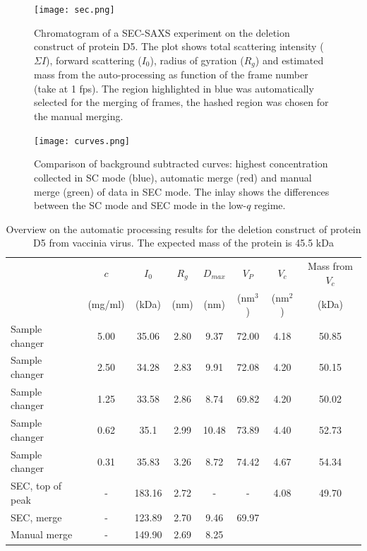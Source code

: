 \documentclass[preprint,pdf]{iucr}              %
\begin{document}
\begin{figure}
\centering
\texttt{[image: sec.png]}
\caption{Chromatogram of a SEC-SAXS experiment on the deletion construct of
protein D5.
The plot shows total scattering intensity ($\Sigma I$), forward scattering
($I_0$), radius of gyration ($R_g$) and estimated mass from the
auto-processing as function of the frame number (take at 1 fps).
The region highlighted in blue was automatically selected for the merging of
frames, the hashed region was chosen for the manual merging.}
\label{fgr:SEC}
\end{figure}

\begin{figure}
\centering
\texttt{[image: curves.png]}
\caption{Comparison of background subtracted curves: highest concentration
collected in SC mode (blue), automatic merge (red) and manual
merge (green) of data in SEC mode. 
The inlay shows the differences between the SC mode and SEC mode in the
low-$q$ regime. }
\label{fgr:curves}
\end{figure}

\begin{table}
\begin{tabular}{ l c | c c c c c c }
   & $c$  & $I_{0}$  & $R_g$ & $D_{max}$ & $V_{P}$ & $V_{c}$ & Mass from $V_{c}$\\
	 &  (mg/ml) & (kDa) & (nm)&  (nm)&  (nm$^{3}$) & (nm$^{2}$) & (kDa)\\
\hline
Sample changer & 5.00  & 35.06 & 2.80 & 9.37  & 72.00 & 4.18 & 50.85 \\
Sample changer & 2.50  & 34.28 & 2.83  & 9.91  & 72.08 & 4.20 & 50.15 \\
Sample changer & 1.25 & 33.58& 2.86  & 8.74  & 69.82 & 4.20 & 50.02 \\
Sample changer & 0.62  & 35.1& 2.99  & 10.48 & 73.89 & 4.40 & 52.73 \\
Sample changer & 0.31 & 35.83  & 3.26  & 8.72  & 74.42& 4.67 & 54.34 \\
SEC, top of peak & - & 183.16 & 2.72  & -  & - & 4.08 & 49.70 \\
SEC, merge & - & 123.89 & 2.70  & 9.46 & 69.97 & &  \\
Manual merge & - &  149.90 & 2.69 & 8.25 & & &  \\
\end{tabular}
\caption{Overview on the automatic processing results for the deletion construct of protein D5 from vaccinia virus. 
The expected mass of the protein is 45.5 kDa}
\label{tbl:results}
\end{table}
\end{document}
